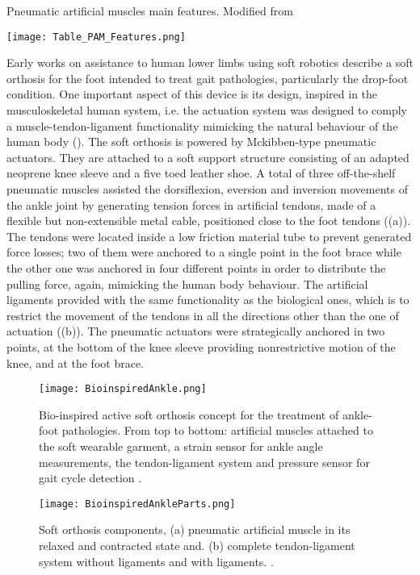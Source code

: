\begin{table}[ht!]
  \caption{Pneumatic artificial muscles main features. Modified from \cite{Belforte2014}}
  \label{tbl:PMAs_feats}
  \centering
  \texttt{[image: Table\_PAM\_Features.png]}
\end{table}

Early works on assistance to human lower limbs using soft robotics \cite{park2011bio,Hamedi2015} describe a soft orthosis for the foot intended to treat gait pathologies, particularly the drop-foot condition. One important aspect of this device is its design, inspired in the musculoskeletal human system, i.e. the actuation system was designed to comply a muscle-tendon-ligament functionality mimicking the natural behaviour of the human body (). The soft orthosis is powered by Mckibben-type pneumatic actuators. They are attached to a soft support structure consisting of an adapted neoprene knee sleeve and a five toed leather shoe. A total of three off-the-shelf pneumatic muscles assisted the dorsiflexion, eversion and inversion movements of the ankle joint by generating tension forces in artificial tendons, made of a flexible but non-extensible metal cable, positioned close to the foot tendons ((a)). The tendons were located inside a low friction material tube to prevent generated force losses; two of them were anchored to a single point in the foot brace while the other one was anchored in four different points in order to distribute the pulling force, again, mimicking the human body behaviour. The artificial ligaments provided with the same functionality as the biological ones, which is to restrict the movement of the tendons in all the directions other than the one of actuation ((b)). The pneumatic actuators were strategically anchored in two points, at the bottom of the knee sleeve providing nonrestrictive motion of the knee, and at the foot brace.
\begin{figure}[hbt!]
    \centering
    \texttt{[image: BioinspiredAnkle.png]}
    \caption{Bio-inspired active soft orthosis concept for the treatment of ankle-foot pathologies. From top to bottom: artificial muscles attached to the soft wearable garment, a strain sensor for ankle angle measurements, the tendon-ligament system and pressure sensor for gait cycle detection \cite{park2011bio}. }
    \label{fig:bio_ankle}
\end{figure}
\begin{figure}[hbt!]
    \centering
    \texttt{[image: BioinspiredAnkleParts.png]}
    \caption{Soft orthosis components, (a) pneumatic artificial muscle in its relaxed and contracted state and. (b) complete tendon-ligament system without ligaments and with ligaments. \cite{park2011bio}. }
    \label{fig:bio_ankle_parts}
\end{figure}

